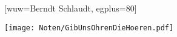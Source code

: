 [wuw={Berndt Schlaudt}, egplus={80}]

\beginverse
\endverse
\centering\texttt{[image: Noten/GibUnsOhrenDieHoeren.pdf]}	

\endsong

\begin{intersong}
\end{intersong}

